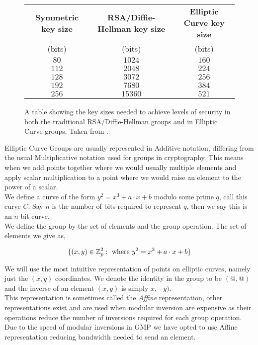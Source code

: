 \documentclass[ %
                    author={Nicholas Tutte},
                supervisor={Prof. Nigel Smart},
                    degree={MEng},
                     title={Secure Two Party Computation},
                  subtitle={A practical comparison of recent protocols},
                      type={Research - GG1K},
                      year={2015} ]{dissertation}
\begin{document}
\begin{appendices}
				\begin{figure}[!htb]
					\begin{tabular}{| c | c | c |}
						\hline
						\textbf{Symmetric key size} & \textbf{RSA/Diffie-Hellman key size} & \textbf{Elliptic Curve key size} \\
						(bits) & (bits) & (bits) \\
						\hline
						\hline
						$80$ & $1024$ & $160$ \\
						\hline
						$112$ & $2048$ & $224$ \\
						\hline
						$128$ & $3072$ & $256$ \\
						\hline
						$192$ & $7680$ & $384$ \\
						\hline
						$256$ & $15360$ & $521$ \\
						\hline
					\end{tabular}

					\caption{A table showing the key sizes needed to achieve levels of security in both the traditional RSA/Diffie-Hellman groups and in Elliptic Curve groups. Taken from \cite{NSA_CaseForECC}. \label{fig:NSA_ECC_Table}}
				\end{figure}

				Elliptic Curve Groups are usually represented in Additive notation, differing from the usual Multiplicative notation used for groups in cryptography. This means when we add points together where we would usually multiple elements and apply scalar multiplication to a point where we would raise an element to the power of a scalar.\\

				We define a curve of the form $y^2 = x^3 + a\cdot x + b$ modulo some prime $q$, call this curve $C$. Say $n$ is the number of bits required to represent $q$, then we say this is an $n$-bit curve.\\

				We define the group by the set of elements and the group operation. The set of elements we give as,

				$$\{(x, y) \in \mathbb{Z}_p^2 : \textnormal{ where } y^2 = x^3 + a\cdot x + b\} $$

				We will use the most intuitive representation of points on elliptic curves, namely just the $(x, y)$ coordinates. We denote the identity in the group to be $(@, @)$ and the inverse of an element $(x, y)$ is simply $x, -y)$.\\

				This representation is sometimes called the \emph{Affine} representation, other representations exist and are used  when modular inversion are expensive as their operations reduce the number of inversions required for each group operation. Due to the speed of modular inversions in GMP we have opted to use Affine representation reducing bandwidth needed to send an element.\\



\end{appendices}
\end{document}

